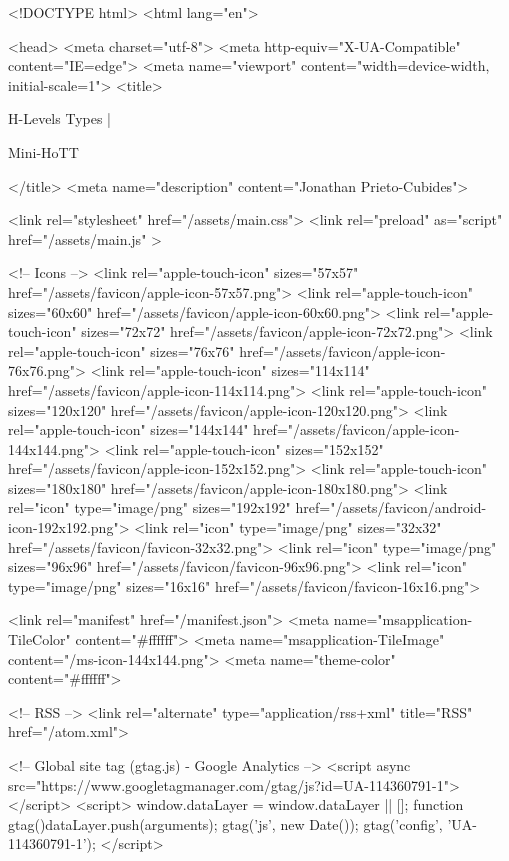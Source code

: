 <!DOCTYPE html>
<html lang="en">

<head>
  <meta charset="utf-8">
  <meta http-equiv="X-UA-Compatible" content="IE=edge">
  <meta name="viewport" content="width=device-width, initial-scale=1">
  <title>
    
      
        H-Levels Types |
      
        Mini-HoTT
    
  </title>
  <meta name="description" content="Jonathan Prieto-Cubides">

  <link rel="stylesheet" href="/assets/main.css">
  <link rel="preload" as="script" href="/assets/main.js" >

  <!-- Icons -->
  <link rel="apple-touch-icon" sizes="57x57" href="/assets/favicon/apple-icon-57x57.png">
  <link rel="apple-touch-icon" sizes="60x60" href="/assets/favicon/apple-icon-60x60.png">
  <link rel="apple-touch-icon" sizes="72x72" href="/assets/favicon/apple-icon-72x72.png">
  <link rel="apple-touch-icon" sizes="76x76" href="/assets/favicon/apple-icon-76x76.png">
  <link rel="apple-touch-icon" sizes="114x114" href="/assets/favicon/apple-icon-114x114.png">
  <link rel="apple-touch-icon" sizes="120x120" href="/assets/favicon/apple-icon-120x120.png">
  <link rel="apple-touch-icon" sizes="144x144" href="/assets/favicon/apple-icon-144x144.png">
  <link rel="apple-touch-icon" sizes="152x152" href="/assets/favicon/apple-icon-152x152.png">
  <link rel="apple-touch-icon" sizes="180x180" href="/assets/favicon/apple-icon-180x180.png">
  <link rel="icon" type="image/png" sizes="192x192"  href="/assets/favicon/android-icon-192x192.png">
  <link rel="icon" type="image/png" sizes="32x32" href="/assets/favicon/favicon-32x32.png">
  <link rel="icon" type="image/png" sizes="96x96" href="/assets/favicon/favicon-96x96.png">
  <link rel="icon" type="image/png" sizes="16x16" href="/assets/favicon/favicon-16x16.png">

  <link rel="manifest" href="/manifest.json">
  <meta name="msapplication-TileColor" content="#ffffff">
  <meta name="msapplication-TileImage" content="/ms-icon-144x144.png">
  <meta name="theme-color" content="#ffffff">

  <!-- RSS -->
  <link rel="alternate" type="application/rss+xml" title="RSS" href="/atom.xml">

  <!-- Global site tag (gtag.js) - Google Analytics -->
  <script async src="https://www.googletagmanager.com/gtag/js?id=UA-114360791-1"></script>
  <script>
    window.dataLayer = window.dataLayer || [];
    function gtag(){dataLayer.push(arguments);}
    gtag('js', new Date());
    gtag('config', 'UA-114360791-1');
  </script>

